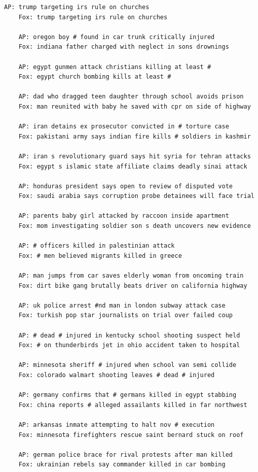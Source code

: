 \documentclass{scrartcl}
\begin{document}
\begin{lstlisting}[basicstyle=\tiny\hlfont]
    AP: trump targeting irs rule on churches
    Fox: trump targeting irs rule on churches

    AP: oregon boy # found in car trunk critically injured
    Fox: indiana father charged with neglect in sons drownings

    AP: egypt gunmen attack christians killing at least #
    Fox: egypt church bombing kills at least #

    AP: dad who dragged teen daughter through school avoids prison
    Fox: man reunited with baby he saved with cpr on side of highway

    AP: iran detains ex prosecutor convicted in # torture case
    Fox: pakistani army says indian fire kills # soldiers in kashmir

    AP: iran s revolutionary guard says hit syria for tehran attacks
    Fox: egypt s islamic state affiliate claims deadly sinai attack

    AP: honduras president says open to review of disputed vote
    Fox: saudi arabia says corruption probe detainees will face trial

    AP: parents baby girl attacked by raccoon inside apartment
    Fox: mom investigating soldier son s death uncovers new evidence

    AP: # officers killed in palestinian attack
    Fox: # men believed migrants killed in greece

    AP: man jumps from car saves elderly woman from oncoming train
    Fox: dirt bike gang brutally beats driver on california highway

    AP: uk police arrest #nd man in london subway attack case
    Fox: turkish pop star journalists on trial over failed coup

    AP: # dead # injured in kentucky school shooting suspect held
    Fox: # on thunderbirds jet in ohio accident taken to hospital

    AP: minnesota sheriff # injured when school van semi collide
    Fox: colorado walmart shooting leaves # dead # injured

    AP: germany confirms that # germans killed in egypt stabbing
    Fox: china reports # alleged assailants killed in far northwest

    AP: arkansas inmate attempting to halt nov # execution
    Fox: minnesota firefighters rescue saint bernard stuck on roof

    AP: german police brace for rival protests after man killed
    Fox: ukrainian rebels say commander killed in car bombing


\end{lstlisting}
\end{document}
